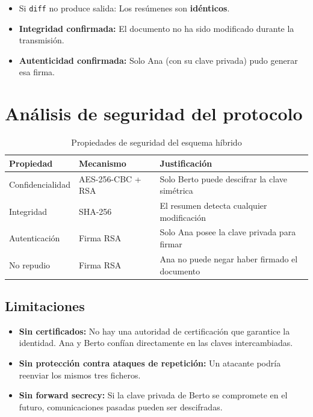 \begin{itemize}[label=\textbullet]
    \item Si \texttt{diff} no produce salida: Los resúmenes son \textbf{idénticos}.
    \item \textbf{Integridad confirmada:} El documento no ha sido modificado durante la transmisión.
    \item \textbf{Autenticidad confirmada:} Solo Ana (con su clave privada) pudo generar esa firma.
\end{itemize}

\section{Análisis de seguridad del protocolo}

\begin{table}[H]
    \centering
    \caption{Propiedades de seguridad del esquema híbrido}
    \begin{tabularx}{\textwidth}{l|l|p{6cm}}
        \toprule
        \textbf{Propiedad} & \textbf{Mecanismo} & \textbf{Justificación} \\
        \midrule
        Confidencialidad & AES-256-CBC + RSA & Solo Berto puede descifrar la clave simétrica \\
        Integridad & SHA-256 & El resumen detecta cualquier modificación \\
        Autenticación & Firma RSA & Solo Ana posee la clave privada para firmar \\
        No repudio & Firma RSA & Ana no puede negar haber firmado el documento \\
        \bottomrule
    \end{tabularx}
\end{table}

\subsection{Limitaciones}

\begin{itemize}[label=\textbullet]
    \item \textbf{Sin certificados:} No hay una autoridad de certificación que garantice la identidad. Ana y Berto confían directamente en las claves intercambiadas.
    \item \textbf{Sin protección contra ataques de repetición:} Un atacante podría reenviar los mismos tres ficheros.
    \item \textbf{Sin forward secrecy:} Si la clave privada de Berto se compromete en el futuro, comunicaciones pasadas pueden ser descifradas.
\end{itemize}
